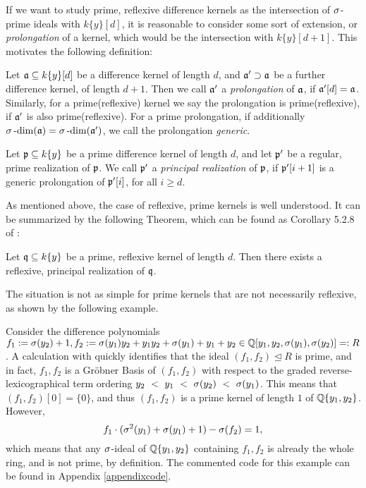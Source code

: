 If we want to study prime, reflexive difference kernels as the intersection of $\sigma$-prime ideals with $k\{y\}[d]$,
it is reasonable to consider some sort of extension, or \emph{prolongation} of a kernel, which would be the intersection with $k\{y\}[d+1]$.  
This motivates the following definition: 

\begin{defn}
Let $\mathfrak{a} \subseteq k\{y\}[d]$ be a difference kernel of length $d$, and $\mathfrak{a}' \supset \mathfrak{a}$ be a further difference kernel, of length $d+1$.
Then we call $\mathfrak{a}'$ a \emph{prolongation} of $\mathfrak{a}$, if $\mathfrak{a}'[d] = \mathfrak{a}$. Similarly, for a prime(reflexive) kernel we say the prolongation is prime(reflexive), if $\mathfrak{a}'$ is also prime(reflexive).
For a prime prolongation, if additionally $\sigma\operatorname{-dim}(\mathfrak{a}) = \sigma\operatorname{-dim}(\mathfrak{a}')$, we call the prolongation \emph{generic}.
\end{defn}

\begin{defn}
Let $\mathfrak{p} \subseteq k\{y\}$ be a prime difference kernel of length $d$, and let $\mathfrak{p}'$ be a regular, prime realization of $\mathfrak{p}$. We call $\mathfrak{p}'$ a \emph{principal realization} of $\mathfrak{p}$, if $\mathfrak{p}'[i+1]$ is a generic prolongation of $\mathfrak{p}'[i]$, for all $i \geq d$. 
\end{defn}

As mentioned above, the case of reflexive, prime kernels is well understood. It can be summarized by the following Theorem, which can be found as Corollary 5.2.8 of \cite{wibmer}:
\begin{theorem}\label{reflexiverealization}
Let $\mathfrak{q} \subseteq k\{y\}$ be a prime, reflexive kernel of length $d$. Then there exists a reflexive, principal realization of $\mathfrak{q}$. 
\end{theorem}

The situation is not as simple for prime kernels that are not necessarily reflexive, as shown by the following example.

\begin{ex}\label{counterexker}
Consider the difference polynomials $f_1 := \sigma(y_2) + 1, f_2:= \sigma(y_1)y_2 + y_1y_2 + \sigma(y_1) + y_1 + y_2 \in \mathbb{Q}[y_1,y_2,\sigma(y_1),\sigma(y_2)] =: R$.
A calculation with \cite{M2} quickly identifies that the ideal $(f_1,f_2) \unlhd R$ is prime, and in fact, $f_1,f_2$ is a Gr\"{o}bner Basis of $(f_1,f_2)$ with respect to the graded reverse-lexicographical
term ordering $y_2~<~y_1~<~\sigma(y_2)~<~\sigma(y_1)$. This means that $(f_1,f_2)[0] = \{0\}$, and thus $(f_1,f_2)$ is a prime kernel of length $1$ of $\mathbb{Q}\{y_1,y_2\}$. However,
\[ f_1 \cdot (\sigma^2(y_1) + \sigma(y_1) + 1 ) - \sigma(f_2) = 1, \]
which means that any $\sigma$-ideal of $\mathbb{Q}\{y_1,y_2\}$ containing $f_1, f_2$ is already the whole ring, and is not prime, by definition.
The commented code for this example can be found in Appendix \ref{appendixcode}.
\end{ex}

